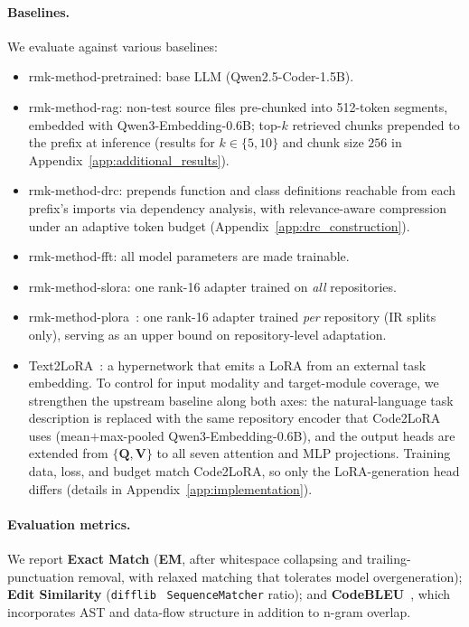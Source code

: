 \documentclass[11pt]{article}
\newcommand{\UseMacro}[1]{\csname rmk-#1\endcsname}
\newcommand{\codelora}{Code2LoRA\xspace}
\newcommand{\textlora}{Text2LoRA\xspace}
\begin{document}
\paragraph{Baselines.}
We evaluate against various baselines:
\begin{itemize}[topsep=3pt,itemsep=1ex,partopsep=0ex,parsep=0ex,leftmargin=*]
\item \UseMacro{method-pretrained}: base LLM (Qwen2.5-Coder-1.5B).
\item \UseMacro{method-rag}: non-test source files pre-chunked into 512-token segments, embedded with Qwen3-Embedding-0.6B; top-$k$ retrieved chunks prepended to the prefix at inference (results for $k\!\in\!\{5,10\}$ and chunk size $256$ in Appendix~\ref{app:additional_results}).
\item \UseMacro{method-drc}\label{sec:setup:drc}\label{sec:benchmark:oracle}: prepends function and class definitions reachable from each prefix's imports via dependency analysis, with relevance-aware compression under an adaptive token budget (Appendix~\ref{app:drc_construction}).
\item \UseMacro{method-fft}: all model parameters are made trainable. %
\item \UseMacro{method-slora}: one rank-16 adapter trained on \emph{all} repositories.
\item \UseMacro{method-plora}~\cite{zong2025mixlanguageexperts}: one rank-16 adapter trained \emph{per} repository (IR splits only), serving as an upper bound on repository-level adaptation.
\item \textlora{}~\cite{charakorn2025text2lora}: a hypernetwork that emits a LoRA from an external task embedding.
To control for input modality and target-module coverage, we strengthen the upstream baseline along both axes: the natural-language task description is replaced with the same repository encoder that \codelora{} uses (mean$+$max-pooled Qwen3-Embedding-0.6B), and the output heads are extended from $\{\mathbf{Q},\mathbf{V}\}$ to all seven attention and MLP projections.
Training data, loss, and budget match \codelora{}, so only the LoRA-generation head differs (details in Appendix~\ref{app:implementation}).
\end{itemize}

\paragraph{Evaluation metrics.}
\label{sec:setup:metrics}
We report \textbf{Exact Match} (\textbf{EM}, after whitespace collapsing and trailing-punctuation removal, with relaxed matching that tolerates model overgeneration); \textbf{Edit Similarity} (\texttt{difflib}~\cite{python_difflib} \texttt{SequenceMatcher} ratio); and \textbf{CodeBLEU}~\cite{ren2020codebleu}, which incorporates AST and data-flow structure in addition to n-gram overlap.
\end{document}
